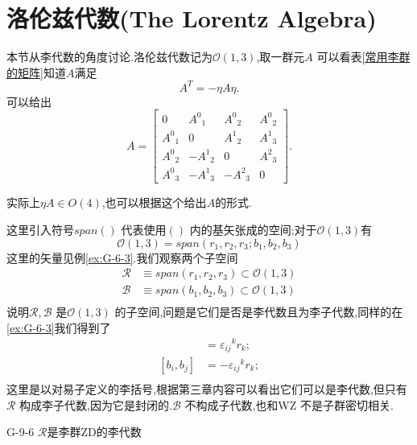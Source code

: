 \documentclass[../main.tex]{subfiles}
\begin{document}
\section{洛伦兹代数(The Lorentz Algebra)}
本节从李代数的角度讨论.洛伦兹代数记为$\mathscr{O}(1,3)$,取一群元$A$ 可以看表\ref{常用李群的矩阵}知道$A$满足\[
	A^T = -\eta A \eta
	.\]
可以给出\[
	A =
	\begin{bmatrix}
		0           & A^{0}{}_{1}   & A^{0}{}_{2}  & A^{0}{}_{2} \\
		A^{0}{}_{1} & 0             & A^{1}{}_{2}  & A^{1}{}_{3} \\
		A^{0}{}_{2} & -A^{1}{}_{2}  & 0            & A^{2}{}_{3} \\
		A^{0}{}_{3} & -A^{1} {}_{3} & -A^{2}{}_{3} & 0
	\end{bmatrix}
	.\]
\begin{note}
	实际上$\eta A \in  O(4)$,也可以根据这个给出$A$的形式.
\end{note}
这里引入符号$span\left(  \right) $ 代表使用$\left(  \right) $ 内的基矢张成的空间;对于$\mathscr{O}(1,3)$有
\begin{equation}
  \mathscr{O}(1,3) =span(r_1,r_2,r_3;b_1,b_2,b_3) \label{eq:9-5}
\end{equation}
	 这里的矢量见例\ref{ex:G-6-3}.我们观察两个子空间
  \begin{align*}
  \mathscr{R}& \equiv span(r_1,r_2,r_3) \subset \mathscr{O}(1,3)\\
  \mathscr{B}& \equiv span(b_1,b_2,b_3) \subset \mathscr{O}(1,3)\\
\end{align*}
说明$\mathscr{R},\mathscr{B}$ 是$\mathscr{O}(1,3)$ 的子空间,问题是它们是否是李代数且为李子代数,同样的在\ref{ex:G-6-3}我们得到了
\begin{align*}
  [r_i,r_j] &= \varepsilon_{ij}{}^{k}r_k;\\
  [b_i,b_j] &= -\varepsilon_{ij}{}^{k}r_k;\\
\end{align*}
这里是以对易子定义的李括号,根据第三章内容可以看出它们可以是李代数,但只有$\mathscr{R}$ 构成李子代数,因为它是封闭的.$\mathscr{B}$ 不构成子代数,也和WZ
不是子群密切相关.
\begin{theorem}{}{G-9-6}
  $\mathscr{R}$是李群ZD的李代数
\end{theorem}
\end{document}
